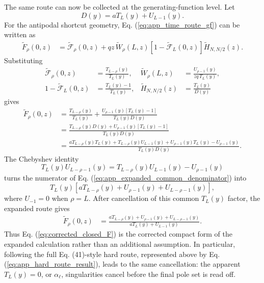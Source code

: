 \documentclass[superscriptaddress, amsmath, amssymb, aps, pre, floatfix]{revtex4-2}
\begin{document}
The same route can now be collected at the generating-function level.  Let
\[
  D(y)=aT_L(y)+U_{L-1}(y).
\]
For the antipodal shortcut geometry, Eq. (\ref{eq:app_time_route_gf}) can be written as
\begin{align}
\widetilde F_{\rho}(0,z)
&=\widetilde{\mathcal F}_{\rho}(0,z)
+qz\,\widetilde W_{\rho}(L,z)
\left[1-\widetilde{\mathcal F}_{L}(0,z)\right]
\widetilde H_{N,N/2}(z).
\label{eq:app_expanded_start}
\end{align}
Substituting
\begin{align}
  \widetilde{\mathcal F}_{\rho}(0,z)&=\frac{T_{L-\rho}(y)}{T_L(y)},&
  \widetilde W_{\rho}(L,z)&=\frac{U_{\rho-1}(y)}{zq\,T_L(y)},\nonumber\\
  1-\widetilde{\mathcal F}_{L}(0,z)&=\frac{T_L(y)-1}{T_L(y)},&
  \widetilde H_{N,N/2}(z)&=\frac{T_L(y)}{D(y)}
\label{eq:app_expanded_inputs}
\end{align}
gives
\begin{align}
\widetilde F_{\rho}(0,z)
&=\frac{T_{L-\rho}(y)}{T_L(y)}
+\frac{U_{\rho-1}(y)\left[T_L(y)-1\right]}{T_L(y)D(y)}\nonumber\\
&=\frac{T_{L-\rho}(y)D(y)+U_{\rho-1}(y)\left[T_L(y)-1\right]}{T_L(y)D(y)}\nonumber\\
&=\frac{aT_{L-\rho}(y)T_L(y)+T_{L-\rho}(y)U_{L-1}(y)+U_{\rho-1}(y)T_L(y)-U_{\rho-1}(y)}{T_L(y)D(y)}.
\label{eq:app_expanded_common_denominator}
\end{align}
The Chebyshev identity
\[
  T_L(y)U_{L-\rho-1}(y)=T_{L-\rho}(y)U_{L-1}(y)-U_{\rho-1}(y)
\]
turns the numerator of Eq. (\ref{eq:app_expanded_common_denominator}) into
\[
  T_L(y)\left[aT_{L-\rho}(y)+U_{\rho-1}(y)+U_{L-\rho-1}(y)\right],
\]
where \(U_{-1}=0\) when \(\rho=L\).  After cancellation of this common \(T_L(y)\) factor, the expanded route gives
\begin{align}
\widetilde F_{\rho}(0,z)
&=
\frac{aT_{L-\rho}(y)+U_{\rho-1}(y)+U_{L-\rho-1}(y)}
{aT_L(y)+U_{L-1}(y)}.
\label{eq:app_expanded_closed_form}
\end{align}
Thus Eq. (\ref{eq:corrected_closed_F}) is the corrected compact form of the expanded calculation rather than an additional assumption.  In particular, following the full Eq. (41)-style hard route, represented above by Eq. (\ref{eq:app_hard_route_result}), leads to the same cancellation: the apparent \(T_L(y)=0\), or \(\alpha_\ell\), singularities cancel before the final pole set is read off.
\end{document}
